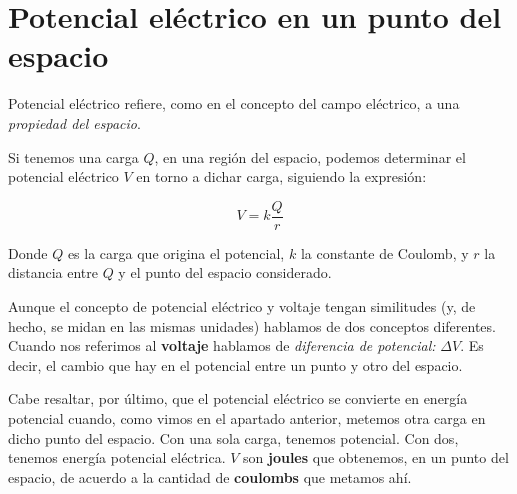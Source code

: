 \section{Potencial eléctrico en un punto del espacio}

Potencial eléctrico refiere,
como en el concepto del campo eléctrico,
a una \textit{propiedad del espacio}.

Si tenemos una carga \(Q\),
en una región del espacio,
podemos determinar el potencial eléctrico \(V\) en torno a dichar carga,
siguiendo la expresión:

\vspace{.5cm}
\begin{equation*}
    V = k\frac{Q}{r}
\end{equation*}
\vspace{.5cm}

Donde \(Q\) es la carga que origina el potencial,
\(k\) la constante de Coulomb,
y \(r\) la distancia entre \(Q\) y el punto del espacio considerado.

Aunque el concepto de potencial eléctrico y voltaje tengan similitudes
(y, de hecho, se midan en las mismas unidades)
hablamos de dos conceptos diferentes.
Cuando nos referimos al \textbf{voltaje} hablamos de \textit{diferencia de potencial:} \(\Delta V\).
Es decir, el cambio que hay en el potencial entre un punto y otro del espacio.

Cabe resaltar,
por último,
que el potencial eléctrico se convierte en energía potencial cuando,
como vimos en el apartado anterior,
metemos otra carga en dicho punto del espacio.
Con una sola carga, tenemos potencial. Con dos, tenemos energía potencial eléctrica.
\(V\) son \textbf{joules} que obtenemos,
en un punto del espacio, 
de acuerdo a la cantidad de \textbf{coulombs} que metamos ahí.